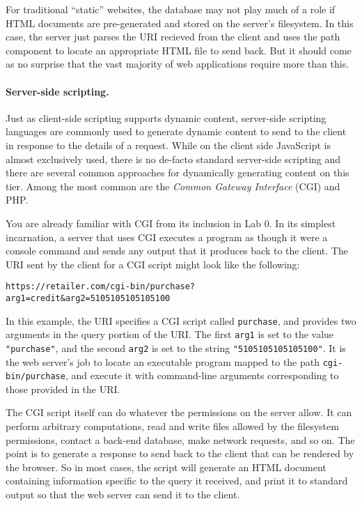 \documentclass[11pt,twoside]{scrartcl}
\begin{document}
For traditional ``static'' websites, the database may not play much of a role if HTML documents are pre-generated and stored on the server's filesystem. In this case, the server just parses the URI recieved from the client and uses the path component to locate an appropriate HTML file to send back. But it should come as no surprise that the vast majority of web applications require more than this.

\paragraph{Server-side scripting.}
Just as client-side scripting supports dynamic content, server-side scripting languages are commonly used to generate dynamic content to send to the client in response to the details of a request. While on the client side JavaScript is almost exclusively used, there is no de-facto standard server-side scripting and there are several common approaches for dynamically generating content on this tier. Among the most common are the \emph{Common Gateway Interface} (CGI) and PHP.

You are already familiar with CGI from its inclusion in Lab 0. In its simplest incarnation, a server that uses CGI executes a program as though it were a console command and sends any output that it produces back to the client. The URI sent by the client for a CGI script might look like the following:
\begin{verbatim}
https://retailer.com/cgi-bin/purchase?arg1=credit&arg2=5105105105105100
\end{verbatim}
In this example, the URI specifies a CGI script called \verb'purchase', and provides two arguments in the query portion of the URI. The first \verb'arg1' is set to the value \verb'"purchase"', and the second \verb'arg2' is set to the string \verb'"5105105105105100"'. It is the web server's job to locate an executable program mapped to the path \verb'cgi-bin/purchase', and execute it with command-line arguments corresponding to those provided in the URI.

The CGI script itself can do whatever the permissions on the server allow. It can perform arbitrary computations, read and write files allowed by the filesystem permissions, contact a back-end database, make network requests, and so on. The point is to generate a response to send back to the client that can be rendered by the browser. So in most cases, the script will generate an HTML document containing information specific to the query it received, and print it to standard output so that the web server can send it to the client.
\end{document}

